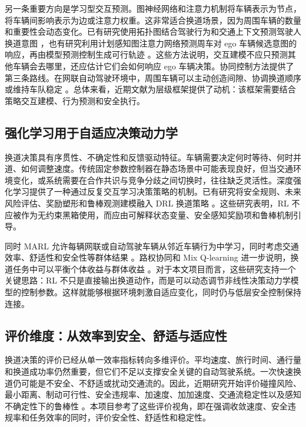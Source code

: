 另一条重要方向是学习型交互预测。图神经网络和注意力机制将车辆表示为节点，将车辆间影响表示为边或注意力权重。这非常适合换道场景，因为周围车辆的数量和重要性会动态变化。已有研究使用拓扑图结合驾驶行为和交通上下文预测驾驶人换道意图 \cite{R5}，也有研究利用计划感知图注意力网络预测周车对 ego 车辆候选意图的响应，再由模型预测控制生成可行轨迹 \cite{R6}。这些方法说明，交互建模不应只预测其他车辆会去哪里，还应估计它们会如何响应 ego 车辆决策。协同控制方法提供了第三条路线。在网联自动驾驶环境中，周围车辆可以主动创造间隙、协调换道顺序或维持车队稳定 \cite{R7,R8}。总体来看，近期文献为层级框架提供了动机：该框架需要结合策略交互建模、行为预测和安全执行。



\subsection{强化学习用于自适应决策动力学}





换道决策具有序贯性、不确定性和反馈驱动特征。车辆需要决定何时等待、何时并道、如何调整速度。传统固定参数控制器在静态场景中可能表现良好，但当交通环境变化，或系统需要在合作共识与竞争分歧之间切换时，往往缺乏灵活性。深度强化学习提供了一种通过反复交互学习决策策略的机制。已有研究将安全规则、未来风险评估、奖励塑形和鲁棒观测建模融入 DRL 换道策略 \cite{R9,R10,R11}。这些研究表明，RL 不应被作为无约束黑箱使用，而应由可解释状态变量、安全感知奖励项和鲁棒机制引导。



同时 MARL 允许每辆网联或自动驾驶车辆从邻近车辆行为中学习，同时考虑交通效率、舒适性和安全性等群体结果 \cite{R12}。路权协同和 Mix Q-learning 进一步说明，换道任务中可以平衡个体收益与群体收益 \cite{R13,R14}。对于本文项目而言，这些研究支持一个关键思路：RL 不只是直接输出换道动作，而是可以动态调节非线性决策动力学模型的控制参数。这样就能够根据环境刺激自适应变化，同时仍与低层安全控制保持连接。



\subsection{评价维度：从效率到安全、舒适与适应性}





换道决策的评价已经从单一效率指标转向多维评价。平均速度、旅行时间、通行量和换道成功率仍然重要，但它们不足以支撑安全关键的自动驾驶系统。一次快速换道仍可能是不安全、不舒适或扰动交通流的。因此，近期研究开始评价碰撞风险、最小距离、制动可行性、安全违规率、加速度、加加速度、交通流稳定性以及感知不确定性下的鲁棒性 \cite{R7,R8,R10,R15}。本项目参考了这些评价视角，即在强调收敛速度、安全违规率和任务效率的同时，评价安全性、舒适性和稳定性。



